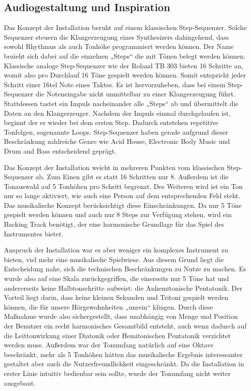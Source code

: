 \subsection{Audiogestaltung und Inspiration}
Das Konzept der Installation beruht auf einem klassischen Step-Sequenzer. Solche Sequenzer steuern die Klangerzeugung eines Synthesizers dahingehend, dass sowohl Rhythmus als auch Tonhöhe programmiert werden können. Der Name bezieht sich dabei auf die einzelnen „Steps“ die mit Tönen belegt werden können. Klassische analoge Step-Sequenzer wie der Roland TB 303 bieten 16 Schritte an, womit also pro Durchlauf 16 Töne gespielt werden können. Somit entspricht jeder Schritt einer 16tel Note eines Taktes. Es ist hervorzuheben, dass bei einem Step-Sequenzer die Noteneingabe nicht unmittelbar zu einer Klangerzeugung führt. Stattdessen tastet ein Impuls nacheinander alle „Steps“ ab und übermittelt die Daten an den Klangerzeuger. Nachdem der Impuls einmal durchgelaufen ist, beginnt der er wieder bei dem ersten Step. Dadurch entstehen repetitive Tonfolgen, sogenannte Loops. Step-Sequenzer haben gerade aufgrund dieser Beschränkung zahlreiche Genre wie Acid House, Electronic Body Music und Drum and Bass entscheidend geprägt.

Das Konzept der Installation weicht in mehreren Punkten vom klassischen Step-Sequenzer ab. Zum Einen gibt es statt 16 Schritten nur 8. Außerdem ist die Tonauswahl auf 5 Tonhöhen pro Schritt begrenzt. Des Weiteren wird ist ein Ton nur so lange aktiviert, wie auch eine Person auf dem entsprechenden Feld steht. Das musikalische Konzept berücksichtigt diese Einschränkungen. Da nur 5 Töne gespielt werden können und auch nur 8 Steps zur Verfügung stehen, wird ein Backing Track benötigt, der eine harmonische Grundlage für das Spiel des Instrumentes bietet.

Anspruch der Installation war es aber weniger ein komplexes Instrument zu bieten, viel mehr eine musikalische Spielwiese. Aus diesem Grund liegt die Entscheidung nahe, sich die technischen Beschränkungen zu Nutze zu machen. Es wurde also auf eine Skala zurückgegriffen, die einerseits nur 5 Töne hat und andererseits keine Halbtonschritte aufweist: die Anhemitonische Pentatonik. Der Vorteil liegt darin, dass keine kleinen Sekunden und Tritoni gespielt werden können, die für unsere Hörgewohnheiten „unrein“ klingen. Durch diese Maßnahme wurde also sichergestellt, dass unabhängig von Menge und Position der Benutzer ein recht harmonisches Gesamtbild entsteht, auch wenn dadurch auf die Leittonwirkung einer Diatonik oder Hemitonischen Pentatonik verzichtet werden muss. Außerdem war der Tonumfang natürlich auf eine Oktave beschränkt, mehr als 5 Tonhöhen hätten das musikalische Ergebnis interessanter gestaltet aber auch die Nutzerfreundlichkeit eingeschränkt. Da die Installation in erster Linie intuitiv bedienbar sein sollte, wurde der Tonumfang nicht weiter ausgebaut.

